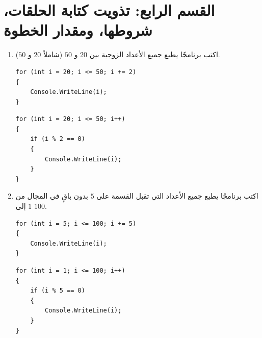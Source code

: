 \documentclass[14pt]{extarticle}
\begin{document}
\section*{القسم الرابع: تذويت كتابة الحلقات، شروطها، ومقدار الخطوة}

\begin{enumerate}[resume, itemsep=1em]

\item اكتب برنامجًا يطبع جميع الأعداد الزوجية بين $20$ و $50$ (شاملاً $20$ و $50$).
\ifwithsols
\begin{boxSolution}
\begin{english}
\begin{verbatim}
for (int i = 20; i <= 50; i += 2)
{
    Console.WriteLine(i);
}
\end{verbatim}
\end{english}
\end{boxSolution}

\filbreak

\begin{boxSolution}
\begin{english}
\begin{verbatim}
for (int i = 20; i <= 50; i++)
{
    if (i % 2 == 0)
    {
        Console.WriteLine(i);
    }
}
\end{verbatim}
\end{english}
\end{boxSolution}
\fi
\filbreak

\item اكتب برنامجًا يطبع جميع الأعداد التي تقبل القسمة على $5$ بدون باقٍ في المجال من $1$ إلى $100$.
\ifwithsols
\begin{boxSolution}[1]
\begin{english}
\begin{verbatim}
for (int i = 5; i <= 100; i += 5)
{
    Console.WriteLine(i);
}
\end{verbatim}
\end{english}
\end{boxSolution}

\filbreak

\begin{boxSolution}[2]
\begin{english}
\begin{verbatim}
for (int i = 1; i <= 100; i++)
{
    if (i % 5 == 0)
    {
        Console.WriteLine(i);
    }
}
\end{verbatim}
\end{english}
\end{boxSolution}
\fi
\filbreak


\end{enumerate}
\end{document}
